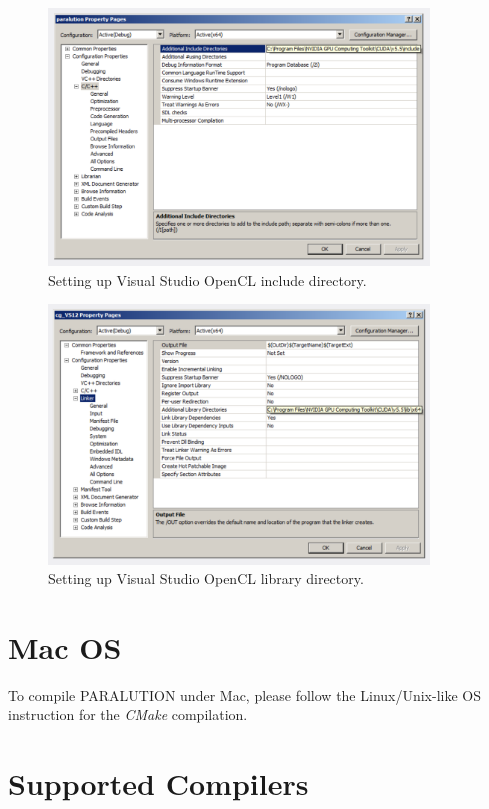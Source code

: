 \begin{figure}[!ht]
\centering
\includegraphics[width=0.9\textwidth]{./fig/visualstudio/ocl_include.pdf}
\caption{Setting up Visual Studio OpenCL include directory.}
\label{ocl_inc}
\end{figure}

\begin{figure}[!ht]
\centering
\includegraphics[width=0.9\textwidth]{./fig/visualstudio/ocl_lib.pdf}
\caption{Setting up Visual Studio OpenCL library directory.}
\label{ocl_lib}
\end{figure}

\section{Mac OS}

To compile PARALUTION under Mac, please follow the Linux/Unix-like OS instruction for the \emph{CMake} compilation.

\section{Supported Compilers}

